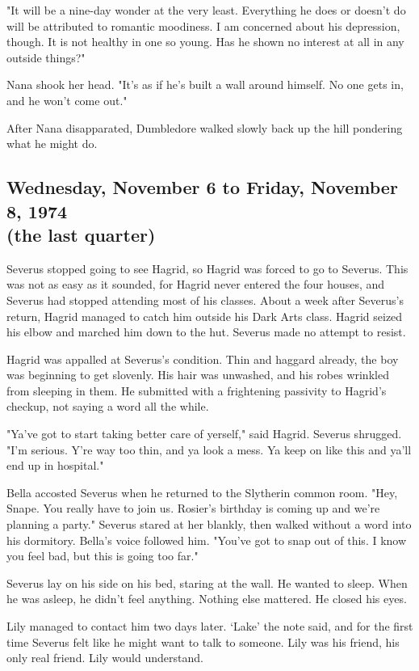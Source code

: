 "It will be a nine-day wonder at the very least. Everything he does or doesn't do will be attributed to romantic moodiness. I am concerned about his depression, though. It is not healthy in one so young. Has he shown no interest at all in any outside things?"

Nana shook her head. "It's as if he's built a wall around himself. No one gets in, and he won't come out."

After Nana disapparated, Dumbledore walked slowly back up the hill pondering what he might do.

\subsection{Wednesday, November 6 to Friday, November 8, 1974 \\ (the last quarter)}

Severus stopped going to see Hagrid, so Hagrid was forced to go to Severus. This was not as easy as it sounded, for Hagrid never entered the four houses, and Severus had stopped attending most of his classes. About a week after Severus's return, Hagrid managed to catch him outside his Dark Arts class. Hagrid seized his elbow and marched him down to the hut. Severus made no attempt to resist.

Hagrid was appalled at Severus's condition. Thin and haggard already, the boy was beginning to get slovenly. His hair was unwashed, and his robes wrinkled from sleeping in them. He submitted with a frightening passivity to Hagrid's checkup, not saying a word all the while.

"Ya've got to start taking better care of yerself," said Hagrid. Severus shrugged. "I'm serious. Y're way too thin, and ya look a mess. Ya keep on like this and ya'll end up in hospital."

Bella accosted Severus when he returned to the Slytherin common room. "Hey, Snape. You really have to join us. Rosier's birthday is coming up and we're planning a party." Severus stared at her blankly, then walked without a word into his dormitory. Bella's voice followed him. "You've got to snap out of this. I know you feel bad, but this is going too far."

Severus lay on his side on his bed, staring at the wall. He wanted to sleep. When he was asleep, he didn't feel anything. Nothing else mattered. He closed his eyes.

Lily managed to contact him two days later. `Lake' the note said, and for the first time Severus felt like he might want to talk to someone. Lily was his friend, his only real friend. Lily would understand.

